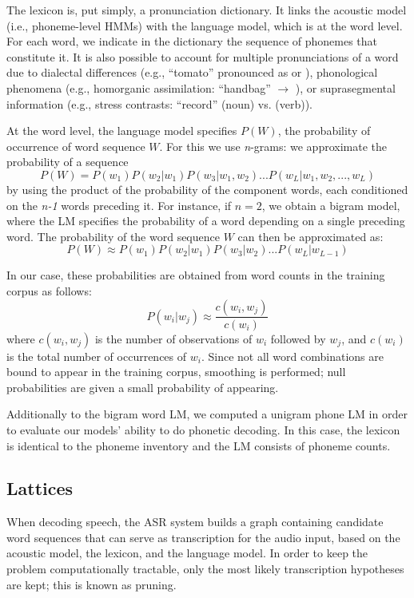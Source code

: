 The lexicon is, put simply, a pronunciation dictionary. It links the acoustic model (i.e., phoneme-level HMMs) with the language model, which is at the word level. For each word, we indicate in the dictionary the sequence of phonemes that constitute it. It is also possible to account for multiple pronunciations of a word due to dialectal differences (e.g., ``tomato'' pronounced as  or ), phonological phenomena (e.g., homorganic assimilation: ``handbag''  $\rightarrow$ ), or suprasegmental information (e.g., stress contrasts: ``record''  (noun) vs.  (verb)).

At the word level, the language model specifies $P(W)$, the probability of occurrence of word sequence $W$. For this we use \textit{n}-grams: we approximate the probability of a sequence
\begin{equation}
P(W) = P(w_{1})P(w_2|w_1)P(w_3 | w_1, w_2)...P(w_L | w_1, w_2, ..., w_L)
\end{equation}
by using the product of the probability of the component words, each conditioned on the \textit{n-1} words preceding it. For instance, if $n = 2$, we obtain a bigram model, where the LM specifies the probability of a word depending on a single preceding word. The probability of the word sequence $W$ can then be approximated as:    
\begin{equation}
P(W) \approx P(w_{1})P(w_2|w_1)P(w_3 | w_2)...P(w_L | w_{L-1})
\end{equation}

In our case, these probabilities are obtained from word counts in the training corpus as follows:
\begin{equation}
P(w_i | w_j) \approx \frac{c(w_i, w_j)}{c(w_i)}
\end{equation}
where $c(w_i, w_j)$ is the number of observations of $w_i$ followed by $w_j$, and $c(w_i)$ is the total number of occurrences of $w_i$.
Since not all word combinations are bound to appear in the training corpus, smoothing is performed; null probabilities are given a small probability of appearing. 

Additionally to the bigram word LM, we computed a unigram phone LM in order to evaluate our models' ability to do phonetic decoding. In this case, the lexicon is identical to the phoneme inventory and the LM consists of phoneme counts.  

\subsection{Lattices}
When decoding speech, the ASR system builds a graph containing candidate word sequences that can serve as transcription for the audio input, based on the acoustic model, the lexicon, and the language model. In order to keep the problem computationally tractable, only the most likely transcription hypotheses are kept; this is known as pruning.

